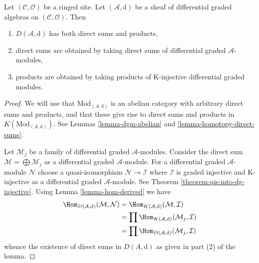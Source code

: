\begin{lemma}
\label{lemma-derived-products}
Let $(\mathcal{C}, \mathcal{O})$ be a ringed site. Let
$(\mathcal{A}, \text{d})$ be a sheaf of differential graded algebras
on $(\mathcal{C}, \mathcal{O})$. Then
\begin{enumerate}
\item $D(\mathcal{A}, \text{d})$ has both direct sums and products,
\item direct sums are obtained by taking direct sums of differential graded
$\mathcal{A}$-modules,
\item products are obtained by taking products of
K-injective differential graded modules.
\end{enumerate}
\end{lemma}

\begin{proof}
We will use that $\text{Mod}_{(A, \text{d})}$ is an abelian category
with arbitrary direct sums and products, and that these give rise
to direct sums and products in $K(\text{Mod}_{(A, \text{d})})$.
See Lemmas \ref{lemma-dgm-abelian} and \ref{lemma-homotopy-direct-sums}.

\medskip\noindent
Let $\mathcal{M}_j$ be a family of differential graded $\mathcal{A}$-modules.
Consider the direct sum $\mathcal{M} = \bigoplus \mathcal{M}_j$
as a differential graded $\mathcal{A}$-module.
For a differential graded $\mathcal{A}$-module
$\mathcal{N}$ choose a quasi-isomorphism
$\mathcal{N} \to \mathcal{I}$ where
$\mathcal{I}$ is graded injective and K-injective as a
differential graded $\mathcal{A}$-module. See
Theorem \ref{theorem-qis-into-dg-injective}.
Using Lemma \ref{lemma-hom-derived} we have
\begin{align*}
\Hom_{D(\mathcal{A}, \text{d})}(\mathcal{M}, \mathcal{N})
& =
\Hom_{K(\mathcal{A}, \text{d})}(\mathcal{M}, \mathcal{I}) \\
& =
\prod \Hom_{K(\mathcal{A}, \text{d})}(\mathcal{M}_j, \mathcal{I}) \\
& =
\prod \Hom_{D(\mathcal{A}, \text{d})}(\mathcal{M}_j, \mathcal{I})
\end{align*}
whence the existence of direct sums in $D(A, \text{d})$ as given in
part (2) of the lemma.


\end{proof}
